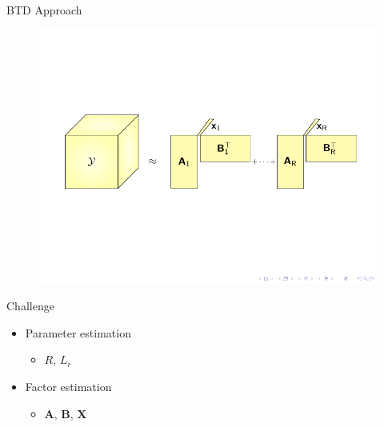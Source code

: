 \documentclass{beamer}
\begin{document}
	\begin{frame}{BTD Approach}
		
		\vspace{-0.7cm}
		\begin{figure}[htb]
			\centering
			\includegraphics[scale=1.0,clip=true,trim={0.8cm 6.5cm 0.6cm 6.2cm}]{figures/tikz_BTDY.pdf}
		\end{figure}
		\vspace{2.8cm}
		\begin{block}{Challenge}			
				\begin{itemize}
					\item Parameter estimation
					\begin{itemize}
						\item $R$, $L_{r}$
					\end{itemize}
					\item Factor estimation
					\begin{itemize}
						\item $\textbf{A}$, $\textbf{B}$, $\textbf{X}$
					\end{itemize}
				\end{itemize}
		\end{block}
	\end{frame}
\end{document}
